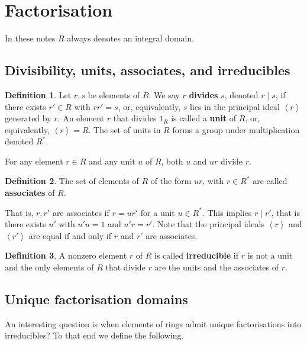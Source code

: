 \documentclass{article}
\newcommand{\ab}[1]{\left\langle #1 \right\rangle}
\theoremstyle{definition}\newtheorem{definition}{Definition}[subsection]
\theoremstyle{definition}\newtheorem{remark}[definition]{Remark}
\theoremstyle{definition}\newtheorem*{example}{Example}
\theoremstyle{definition}\newtheorem*{note}{Note}
\begin{document}
\pagebreak

\section{Factorisation}

In these notes $ R $ always denotes an integral domain.

\subsection{Divisibility, units, associates, and irreducibles}

\begin{definition}
Let $ r, s $ be elements of $ R $. We say $ r $ \textbf{divides} $ s $, denoted $ r \mid s $, if there exists $ r' \in R $ with $ rr' = s $, or, equivalently, $ s $ lies in the principal ideal $ \ab{r} $ generated by $ r $. An element $ r $ that divides $ 1_R $ is called a \textbf{unit} of $ R $, or, equivalently, $ \ab{r} = R $. The set of units in $ R $ forms a group under multiplication denoted $ R^* $.
\end{definition}

For any element $ r \in R $ and any unit $ u $ of $ R $, both $ u $ and $ ur $ divide $ r $.

\begin{definition}
The set of elements of $ R $ of the form $ ur $, with $ r \in R^* $ are called \textbf{associates} of $ R $.
\end{definition}

That is, $ r, r' $ are associates if $ r = ur' $ for a unit $ u \in R^* $. This implies $ r \mid r' $, that is there exists $ u' $ with $ u'u = 1 $ and $ u'r = r' $. Note that the principal ideals $ \ab{r} $ and $ \ab{r'} $ are equal if and only if $ r $ and $ r' $ are associates.

\begin{definition}
A nonzero element $ r $ of $ R $ is called \textbf{irreducible} if $ r $ is not a unit and the only elements of $ R $ that divide $ r $ are the units and the associates of $ r $.
\end{definition}

\subsection{Unique factorisation domains}

An interesting question is when elements of rings admit unique factorisations into irreducibles? To that end we define the following.
\end{document}
